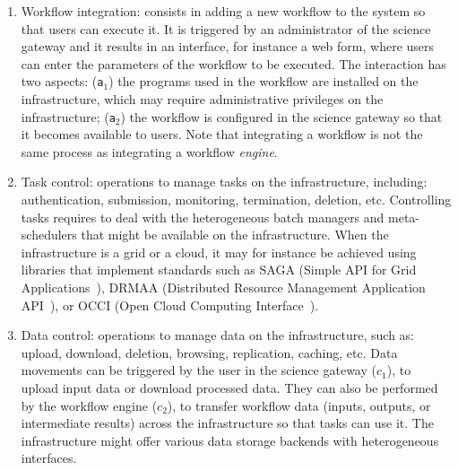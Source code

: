 \documentclass[preprint,3p,twocolumn]{elsarticle}
\newcommand{\closedanswerednote}[6]{}
\begin{document}
\begin{enumerate}[leftmargin=0cm,itemindent=0.65cm,label=\texttt{(\alph*)}]

\item Workflow integration: consists in adding a new workflow to the
  system so that users can execute it. It is triggered by an
  administrator of the science gateway and it results in an interface,
  for instance a web form, where users can enter the parameters of the
  workflow to be executed. The interaction has two aspects:
  (\texttt{a$_1$}) the programs used in the workflow are installed on
  the infrastructure, which may require administrative privileges on
  the infrastructure; (\texttt{a$_2$}) the workflow is configured in
  the science gateway so that it becomes available to users. Note that
  integrating a workflow is not the same process as integrating a
  workflow \emph{engine}.
\item Task control: operations to manage tasks on the infrastructure,
  including: authentication, submission, monitoring, termination,
  deletion, etc. Controlling tasks requires to deal with the
  heterogeneous batch managers and meta-schedulers that might be
  available on the infrastructure. When the infrastructure is a grid
  or a cloud, it may for instance be achieved using libraries that
  implement standards such as SAGA (Simple API for Grid
  Applications~\cite{goodale2006saga}), DRMAA (Distributed Resource
  Management Application API~\cite{troger2012distributed}), or OCCI
  (Open Cloud Computing Interface~\cite{edmonds2012toward}).
\item Data control: operations to manage data on the infrastructure,
  such as: upload, download, deletion, browsing, replication, caching,
  etc. Data movements can be triggered by the user in the science
  gateway (\texttt{$c_1$}), to upload input data or download processed
  data. They can also be performed by the workflow engine
  (\texttt{$c_2$}), to transfer workflow data (inputs, outputs, or
  intermediate results) across the infrastructure so that tasks can
  use it. The infrastructure might offer various data storage backends
  with heterogeneous interfaces. \closedanswerednote{Marc-Etienne}{this -c2- can be also trigerred
    by the user}{Tristan}{No, it can't: this is by definition an interaction between the workflow engine and the infrastructure. It is used to transfer data to/from tasks. I reworded a bit, is it clearer now?}
    {Marc-e}{I meant, "using c1", a user in some platforms (CBRAIN), can trigger
    some operations across the infrastructure, as in c2... not just up/download data.
}
\end{enumerate}
\end{document}
